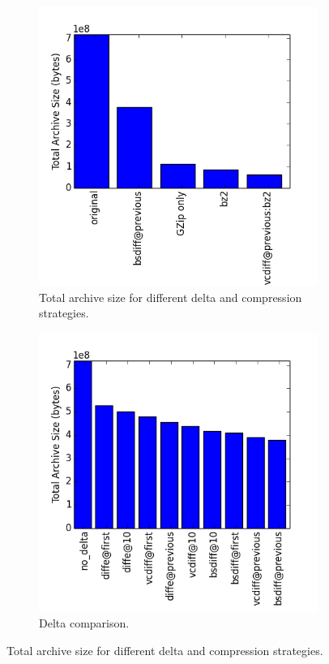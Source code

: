 \documentclass[11pt]{article}
\begin{document}
\begin{figure}
\centering
\begin{subfigure}{.5\textwidth}
  \centering
  \includegraphics[width=\linewidth]{images/tas_best.png}
  \caption{Total archive size for different delta and compression strategies.}
  \label{fig:tas_best}
\end{subfigure}%
\begin{subfigure}{.5\textwidth}
  \centering
  \includegraphics[width=\linewidth]{images/tas_delta.png}
  \caption{Delta comparison.}
  \label{fig:tas_delta_compression:b}
\end{subfigure}
\caption{Total archive size for different delta and compression strategies.}
\label{fig:tas_delta_compression}
\end{figure}
\end{document}
